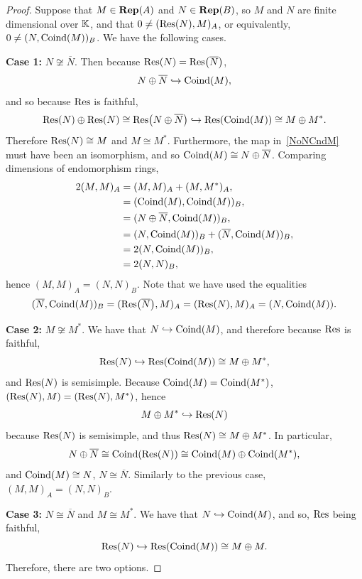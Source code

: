 \begin{proof}
Suppose that $M \in \operatorname{\mathbf{Rep}}(A)$ and $N \in \operatorname{\mathbf{Rep}}(B)$, so $M$ and $N$ are finite dimensional over ${\mathbb K}$, and that $0 \neq (\Res(N),M)_A$, or equivalently, $0 \neq (N, \operatorname{Coind}(M))_B$. We have the following cases.

\vspace{0.5em}
\textbf{Case 1:} $N \not\cong \overline{N}$. Then because $\Res(N) = \Res(\overline{N})$,
\begin{equation} \label{NoNCndM}
N \oplus \overline{N} \hookrightarrow \operatorname{Coind}(M),
\end{equation}
and so because $\Res$ is faithful,
\[
\Res(N) \oplus \Res(N) \cong \Res(N \oplus \overline{N}) \hookrightarrow \Res(\Cnd(M)) \cong M \oplus M^*.
\]
Therefore $\Res(N) \cong M$ and $M \cong M^*$. Furthermore, the map in~\eqref{NoNCndM} must have been an isomorphism, and so $\operatorname{Coind}(M) \cong N \oplus \overline{N}$. Comparing dimensions of endomorphism rings,
\begin{align*}
    2(M,M)_A &= (M,M)_A + (M,M^*)_A, \\
    &= (\operatorname{Coind}(M), \operatorname{Coind}(M))_B, \\
    &= (N \oplus \overline{N}, \operatorname{Coind}(M))_B, \\
    &= (N,\operatorname{Coind}(M))_B + (\overline{N}, \operatorname{Coind}(M))_B, \\
    &= 2(N,\operatorname{Coind}(M))_B, \\
    &= 2 (N,N)_B,
\end{align*}
hence $(M,M)_A = (N,N)_B$. Note that we have used the equalities
\[
(\overline{N}, \Cnd(M))_B = (\Res(\overline{N}), M)_A = (\Res(N), M)_A = (N, \Cnd(M)).
\]

\vspace{0.5em}
\textbf{Case 2:} $M \not\cong M^*$. We have that $N \hookrightarrow \operatorname{Coind}(M)$, and therefore because $\Res$ is faithful,
\[
\Res(N) \hookrightarrow \Res(\Cnd(M)) \cong M \oplus M^*,
\]
and $\Res(N)$ is semisimple. Because $\operatorname{Coind}(M) = \operatorname{Coind}(M^*)$, $(\Res(N), M) = (\Res(N),M^*)$, hence
\[
M \oplus M^* \hookrightarrow \Res(N)
\]
because $\Res(N)$ is semisimple, and thus $\Res(N) \cong M \oplus M^*$. In particular,
\[
N \oplus \overline{N} \cong \Cnd(\Res(N)) \cong \Cnd(M) \oplus \Cnd(M^*),
\]
and $\operatorname{Coind}(M) \cong N$, $N \cong \overline{N}$. Similarly to the previous case, $(M,M)_A = (N,N)_B$.

\vspace{0.5em}
\textbf{Case 3:} $N \cong \overline{N}$ and $M \cong M^*$. We have that $N \hookrightarrow \operatorname{Coind}(M)$, and so, $\Res$ being faithful,
\[
\Res(N) \hookrightarrow \Res(\Cnd(M)) \cong M \oplus M.
\]
Therefore, there are two options.


\end{proof}

